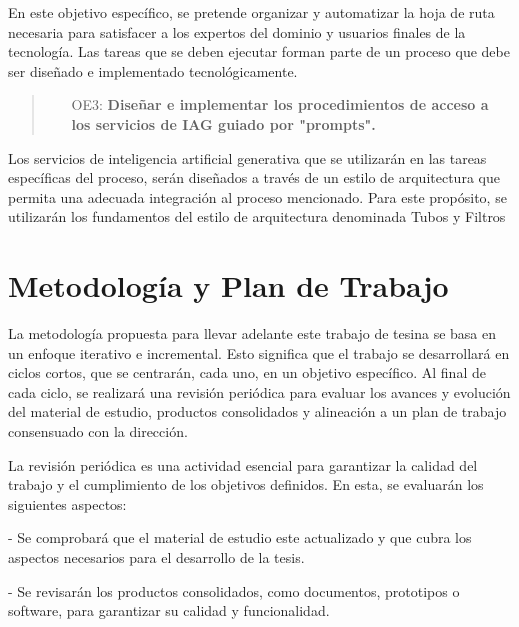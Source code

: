 \documentclass[12pt]{article}
\begin{document}
        En este objetivo específico, se pretende organizar y automatizar la hoja de ruta necesaria para satisfacer a los expertos del dominio y usuarios finales de la tecnología. Las tareas que se deben ejecutar forman parte de un proceso que debe ser diseñado e implementado tecnológicamente.

        
        \vspace{0.3 cm}

        \begin{quote}
            \begin{itemize}
                    \item [OE3:] \textbf{Diseñar e implementar los procedimientos de acceso a los servicios de IAG guiado por "prompts".}
            \end{itemize}
        \end{quote}

        \vspace{0.3 cm}

        Los servicios de inteligencia artificial generativa que se utilizarán en las tareas específicas del proceso, serán diseñados a través de un estilo de arquitectura que permita una adecuada integración al proceso mencionado. Para este propósito, se utilizarán los fundamentos del estilo de arquitectura denominada Tubos y Filtros \cite{land2002brief}
        

\section{Metodología y Plan de Trabajo}

La metodología propuesta para llevar adelante este trabajo de tesina se basa en un enfoque iterativo e incremental. Esto significa que el trabajo se desarrollará en ciclos cortos, que se centrarán, cada uno, en un objetivo específico. Al final de cada ciclo, se realizará una revisión periódica para evaluar los avances y evolución del material de estudio, productos consolidados y alineación a un plan de trabajo consensuado con la dirección.

La revisión periódica es una actividad esencial para garantizar la calidad del trabajo y el cumplimiento de los objetivos definidos. En esta, se evaluarán los siguientes aspectos:

- Se comprobará que el material de estudio este actualizado y que cubra los aspectos necesarios para el desarrollo de la tesis.

- Se revisarán los productos consolidados, como documentos, prototipos o software, para garantizar su calidad y funcionalidad.
\end{document}
